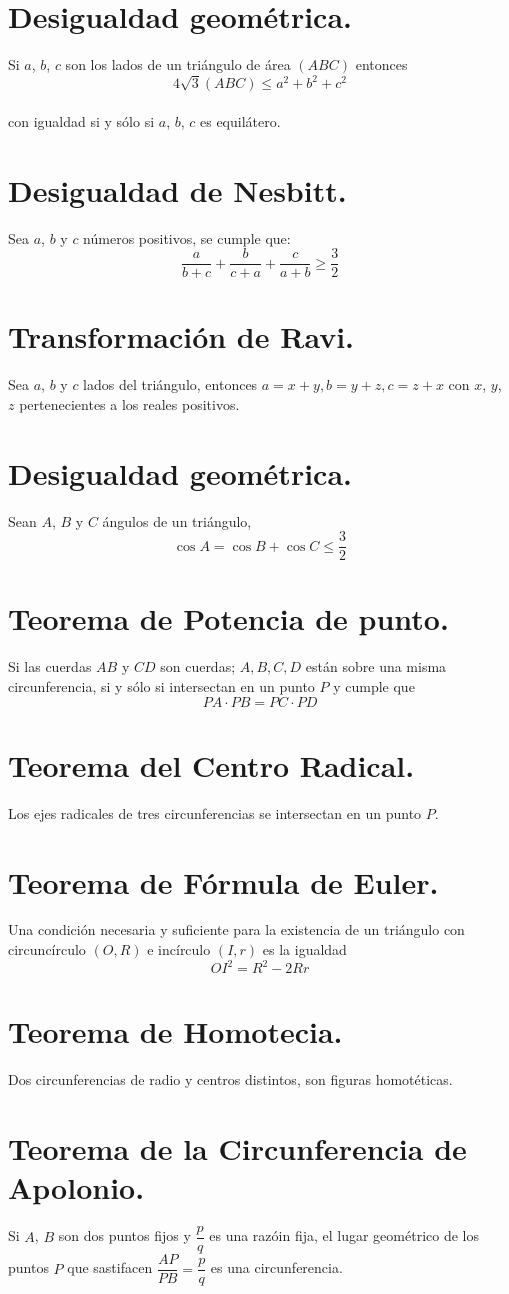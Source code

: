 \documentclass[12pt,a4paper]{book}
\begin{document}
\section{Desigualdad geométrica.}
Si $a$, $b$, $c$ son los lados de un triángulo de área $(ABC)$ entonces $$4\sqrt{3}(ABC) \leq a^2 + b^2 + c^2$$
\\con igualdad si y sólo si $a$, $b$, $c$ es equilátero.
\section{Desigualdad de Nesbitt.}
Sea $a$, $b$ y $c$ números positivos, se cumple que:
$$\dfrac{a}{b+c} + \dfrac{b}{c+a}+ \dfrac{c}{a+b} \geq \dfrac{3}{2}$$
\section{Transformación de Ravi.}
Sea $a$, $b$ y $c$ lados del triángulo, entonces $a=x+y, b=y+z, c=z+x$ con $x$, $y$, $z$ pertenecientes a los reales positivos.
\section{Desigualdad geométrica.}
Sean $A$, $B$ y $C$ ángulos de un triángulo, $$\cos A =\cos B +\cos C \leq \dfrac{3}{2}$$ 
\section{Teorema de Potencia de punto.}
Si las cuerdas $AB$ y $CD$ son cuerdas; $A, B, C, D$ están sobre una misma circunferencia, si y sólo si intersectan en un punto $P$ y cumple que $$PA \cdot PB = PC \cdot PD$$
\section{Teorema del Centro Radical.}
Los ejes radicales de tres circunferencias se intersectan en un punto $P$.
\section{Teorema de Fórmula de Euler.}
Una condición necesaria y suficiente para la existencia de un triángulo con circuncírculo $( O, R)$ e incírculo $(I, r)$ es la igualdad $$OI ^2= R^2 - 2Rr$$
\section{Teorema de Homotecia.}
Dos circunferencias de radio  y centros distintos, son figuras homotéticas.
\section{Teorema de la Circunferencia de Apolonio.}
Si $A$, $B$ son dos puntos fijos y $\dfrac{p}{q}$ es una razóin fija, el lugar geométrico de los puntos $P$ que sastifacen $\dfrac{AP}{PB}=\dfrac{p}{q}$ es una circunferencia.
\end{document}
